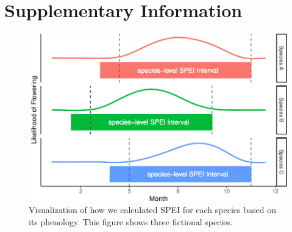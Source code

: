 \documentclass[12pt, letterpaper]{article}
\begin{document}










\renewcommand{\thetable}{S\arabic{table}} %
\setcounter{table}{0} %
\renewcommand{\thefigure}{S\arabic{figure}} %
\setcounter{figure}{0} %


\section{Supplementary Information}

\begin{figure}
\includegraphics[width=.8\textwidth]{uniqueSPEIfig-1.pdf}
\caption{\small{
Visualization of how we calculated SPEI for each species based on its phenology. This figure shows three fictional species.
}}
\label{fig:SPEI_fig}
\end{figure}
\end{document}
